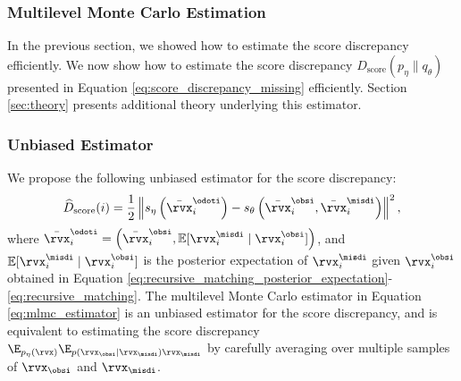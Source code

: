 \documentclass{article} %
\begin{document}
\subsubsection{Multilevel Monte Carlo Estimation}
\label{sec:mlmc_estimator}
In the previous section, we showed how to estimate the score discrepancy efficiently. We now show how to estimate the score discrepancy $D_{\text{score}}(p_{\eta} \| q_{\theta})$ presented in Equation \eqref{eq:score_discrepancy_missing} efficiently. Section \ref{sec:theory} presents additional theory underlying this estimator.

\subsubsection{Unbiased Estimator}

We propose the following unbiased estimator for the score discrepancy:
\begin{align}
	\widehat{D}_{\text{score}}(i) = \frac{1}{2} \left\| s_{\eta} \left( \bar{\rvx}_{i}^{\odoti} \right) - s_{\theta} \left( \bar{\rvx}_{i}^{\obsi}, \bar{\rvx}_{i}^{\misdi} \right) \right\|^{2}, \label{eq:mlmc_estimator}
\end{align}
where $\bar{\rvx}_{i}^{\odoti} = \left( \bar{\rvx}_{i}^{\obsi}, \mathbb{E}[\rvx_{i}^{\misdi} \mid \rvx_{i}^{\obsi}] \right)$, and $\mathbb{E}[\rvx_{i}^{\misdi} \mid \rvx_{i}^{\obsi}]$ is the posterior expectation of $\rvx_{i}^{\misdi}$ given $\rvx_{i}^{\obsi}$ obtained in Equation \eqref{eq:recursive_matching_posterior_expectation}-\eqref{eq:recursive_matching}. The multilevel Monte Carlo estimator in Equation \eqref{eq:mlmc_estimator} is an unbiased estimator for the score discrepancy, and is equivalent to estimating the score discrepancy $\E_{p_{\eta}(\rvx)} \E_{p(\rvx_{\obsi} | \rvx_{\misdi}) \rvx_{\misdi}}$ by carefully averaging over multiple samples of $\rvx_{\obsi}$ and $\rvx_{\misdi}$.
\end{document}
